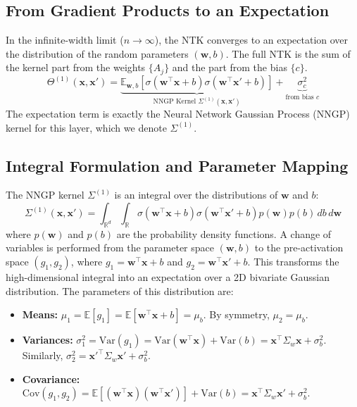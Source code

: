 \documentclass[12pt]{article}
\begin{document}
\subsection{From Gradient Products to an Expectation}
In the infinite-width limit ($n \to \infty$), the NTK converges to an expectation over the distribution of the random parameters $(\bm{w}, b)$. The full NTK is the sum of the kernel part from the weights $\{A_j\}$ and the part from the bias $\{c\}$.
\begin{equation}
\label{eq:ntk_expectation}
    \Theta^{(1)}(\bm{x}, \bm{x}') = \underbrace{\mathbb{E}_{\bm{w},b} \left[ \sigma(\bm{w}^\top \bm{x} + b)\sigma(\bm{w}^\top \bm{x}' + b) \right]}_{\text{NNGP Kernel } \Sigma^{(1)}(\bm{x}, \bm{x}')} + \underbrace{\sigma_c^2}_{\text{from bias } c}
\end{equation}
The expectation term is exactly the Neural Network Gaussian Process (NNGP) kernel for this layer, which we denote $\Sigma^{(1)}$.

\subsection{Integral Formulation and Parameter Mapping}
The NNGP kernel $\Sigma^{(1)}$ is an integral over the distributions of $\bm{w}$ and $b$:
\begin{equation}
    \Sigma^{(1)}(\bm{x}, \bm{x}') = \int_{\mathbb{R}^d} \int_{\mathbb{R}} \sigma(\bm{w}^\top \bm{x} + b)\sigma(\bm{w}^\top \bm{x}' + b) p(\bm{w})p(b) \,db \,d\bm{w}
\end{equation}
where $p(\bm{w})$ and $p(b)$ are the probability density functions. A change of variables is performed from the parameter space $(\bm{w}, b)$ to the pre-activation space $(g_1, g_2)$, where $g_1 = \bm{w}^\top \bm{x} + b$ and $g_2 = \bm{w}^\top \bm{x}' + b$. This transforms the high-dimensional integral into an expectation over a 2D bivariate Gaussian distribution. The parameters of this distribution are:
\begin{itemize}
    \item \textbf{Means:} $\mu_1 = \mathbb{E}[g_1] = \mathbb{E}[\bm{w}^\top\bm{x} + b] = \mu_b$. By symmetry, $\mu_2 = \mu_b$.
    \item \textbf{Variances:} $\sigma_1^2 = \text{Var}(g_1) = \text{Var}(\bm{w}^\top\bm{x}) + \text{Var}(b) = \bm{x}^\top \Sigma_w \bm{x} + \sigma_b^2$. Similarly, $\sigma_2^2 = {\bm{x}'}^\top \Sigma_w \bm{x}' + \sigma_b^2$.
    \item \textbf{Covariance:} $\text{Cov}(g_1, g_2) = \mathbb{E}[(\bm{w}^\top\bm{x})(\bm{w}^\top\bm{x}')] + \text{Var}(b) = \bm{x}^\top \Sigma_w \bm{x}' + \sigma_b^2$.
\end{itemize}
\end{document}

